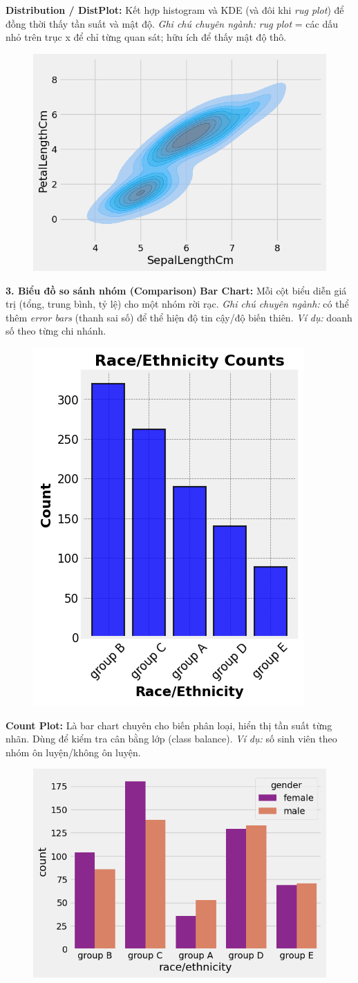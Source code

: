 \documentclass[11pt]{article}
\begin{document}
\textbf{Distribution / DistPlot:} Kết hợp histogram và KDE (và đôi khi \emph{rug plot}) để đồng thời thấy tần suất và mật độ.
\textit{Ghi chú chuyên ngành:} \emph{rug plot} = các dấu nhỏ trên trục x để chỉ từng quan sát; hữu ích để thấy mật độ thô.
\begin{figure}[H]
    \centering
    \includegraphics[width=0.4\linewidth]{images/Displot.png}
\end{figure}


\medskip
\noindent \textbf{3. Biểu đồ so sánh nhóm (Comparison)}
\medskip
\textbf{Bar Chart:} Mỗi cột biểu diễn giá trị (tổng, trung bình, tỷ lệ) cho một nhóm rời rạc.
\textit{Ghi chú chuyên ngành:} có thể thêm \emph{error bars} (thanh sai số) để thể hiện độ tin cậy/độ biến thiên.
\textit{Ví dụ:} doanh số theo từng chi nhánh.
\begin{figure}[H]
    \centering
    \includegraphics[width=0.3\linewidth]{images/BarC.png}
\end{figure}

\medskip
\textbf{Count Plot:} Là bar chart chuyên cho biến phân loại, hiển thị tần suất từng nhãn. Dùng để kiểm tra cân bằng lớp (class balance).
\textit{Ví dụ:} số sinh viên theo nhóm ôn luyện/không ôn luyện.
\begin{figure}[H]
    \centering
    \includegraphics[width=0.3\linewidth]{images/CountPlots.png}
\end{figure}
\end{document}
